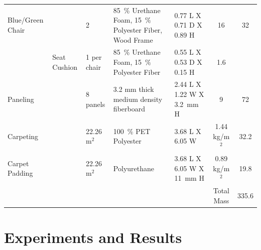 \documentclass[12pt,oneside]{book}
\begin{document}
\begin{table}
\begin{tabular}{lllllcc}
		Blue/Green Chair   & 				& 2				& 85~\% Urethane Foam, 15~\% Polyester Fiber, Wood Frame        &  0.77 L X 0.71 D X 0.89 H  	&  16    			& 32 \\
		                   & Seat Cushion	& 1 per chair	& 85~\% Urethane Foam, 15~\% Polyester Fiber		            &  0.55 L X 0.53 D X 0.15 H  	&  1.6    			& \\
		Paneling           &				& 8 panels		& 3.2 mm thick medium density fiberboard                   		&  2.44 L X 1.22 W X 3.2~mm H   &  9    			& 72 \\
		Carpeting          &				& 22.26 m$^2$	& 100~\% PET Polyester                  						&  3.68 L X 6.05 W  			&  1.44 kg/m$^2$	& 32.2 \\
		Carpet Padding     &				& 22.26 m$^2$	& Polyurethane                 	 								&  3.68 L X 6.05 W X 11~mm H    &  0.89 kg/m$^2$    & 19.8 \\
		                   &                &               &                                                               &                               & Total Mass        & 335.6 \\
		\bottomrule[1.25pt]
	\end{tabular}
	\label{tab:Fire_Suppression_Fuel_Masses}
\end{table}




\chapter{Experiments and Results}
\label{chap:Experiments_and_Results}
\end{document}
